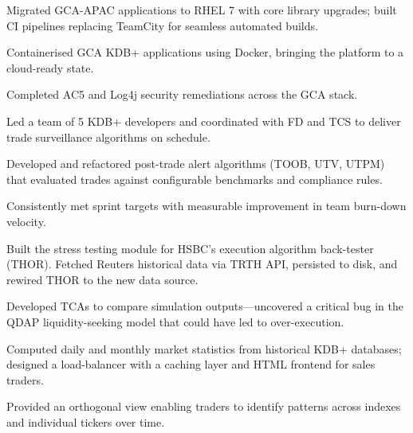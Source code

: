 \documentclass[]{deedy-resume-openfont}
\begin{document}
\begin{tightemize}
    \item Migrated GCA-APAC applications to RHEL 7 with core library upgrades; built CI pipelines replacing TeamCity for seamless automated builds.
    \item Containerised GCA KDB+ applications using Docker, bringing the platform to a cloud-ready state.
    \item Completed AC5 and Log4j security remediations across the GCA stack.
\end{tightemize}
\sectionsep

\vspace{\topsep}

\begin{tightemize}
    \item Led a team of 5 KDB+ developers and coordinated with FD and TCS to deliver trade surveillance algorithms on schedule.
    \item Developed and refactored post-trade alert algorithms (TOOB, UTV, UTPM) that evaluated trades against configurable benchmarks and compliance rules.
    \item Consistently met sprint targets with measurable improvement in team burn-down velocity.
\end{tightemize}
\sectionsep

\vspace{\topsep}

\begin{tightemize}
    \item Built the stress testing module for HSBC's execution algorithm back-tester (THOR). Fetched Reuters historical data via TRTH API, persisted to disk, and rewired THOR to the new data source.
    \item Developed TCAs to compare simulation outputs—uncovered a critical bug in the QDAP liquidity-seeking model that could have led to over-execution.
\end{tightemize}

\begin{tightemize}
    \item Computed daily and monthly market statistics from historical KDB+ databases; designed a load-balancer with a caching layer and HTML frontend for sales traders.
    \item Provided an orthogonal view enabling traders to identify patterns across indexes and individual tickers over time.
\end{tightemize}
\end{document}
